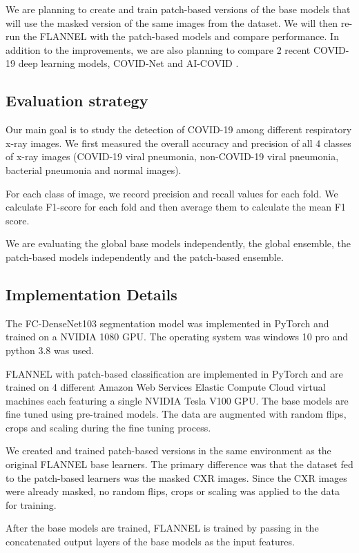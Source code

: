 \documentclass{sigkddExp}
\begin{document}
We are planning to create and train patch-based versions of the base models
that will use the masked version of the same images from the dataset. We will
then re-run the FLANNEL with the patch-based models and compare performance.
In addition to the improvements, we are  also planning to compare 2 recent
COVID-19 deep learning models, COVID-Net \cite{wang2020covidnet} and AI-COVID
\cite{pmid32339081}.


\subsection{Evaluation strategy}
Our main goal is to study the detection of COVID-19 among different respiratory
x-ray images. We first measured the overall accuracy and precision of all 4
classes of x-ray images (COVID-19 viral pneumonia, non-COVID-19 viral pneumonia,
bacterial pneumonia and normal images).

For each class of image, we record precision and recall values for each fold.
We calculate F1-score for each fold and then average them to calculate the mean
F1 score.

We are evaluating the global base models independently, the global ensemble,
the patch-based models independently and the patch-based ensemble.

\subsection{Implementation Details}
The FC-DenseNet103 segmentation model was implemented in PyTorch and trained on
a NVIDIA 1080 GPU. The operating system was windows 10 pro and python 3.8 was
used.

FLANNEL with patch-based classification are implemented in PyTorch and are
trained on 4 different Amazon Web Services Elastic Compute Cloud virtual
machines each featuring a single NVIDIA Tesla V100 GPU. The base models are fine
tuned using pre-trained models. The data are augmented with random flips, crops
and scaling during the fine tuning process.


We created and trained patch-based versions in the same environment as the
original FLANNEL base learners. The primary difference was that the dataset fed
to the patch-based learners was the masked CXR images. Since the CXR images were
already masked, no random flips, crops or scaling was applied to the data for
training.


After the base models are trained, FLANNEL is trained by passing in the
concatenated output layers of the base models as the input features.
\end{document}
